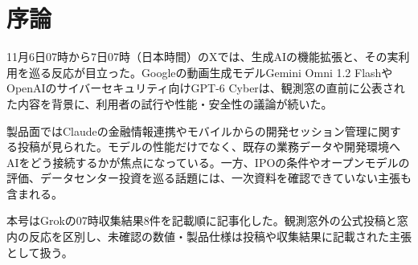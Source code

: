 \section{序論}
11月6日07時から7日07時（日本時間）のXでは、生成AIの機能拡張と、その実利用を巡る反応が目立った。Googleの動画生成モデルGemini Omni 1.2 FlashやOpenAIのサイバーセキュリティ向けGPT-6 Cyberは、観測窓の直前に公表された内容を背景に、利用者の試行や性能・安全性の議論が続いた。

製品面ではClaudeの金融情報連携やモバイルからの開発セッション管理に関する投稿が見られた。モデルの性能だけでなく、既存の業務データや開発環境へAIをどう接続するかが焦点になっている。一方、IPOの条件やオープンモデルの評価、データセンター投資を巡る話題には、一次資料を確認できていない主張も含まれる。

本号はGrokの07時収集結果8件を記載順に記事化した。観測窓外の公式投稿と窓内の反応を区別し、未確認の数値・製品仕様は投稿や収集結果に記載された主張として扱う。